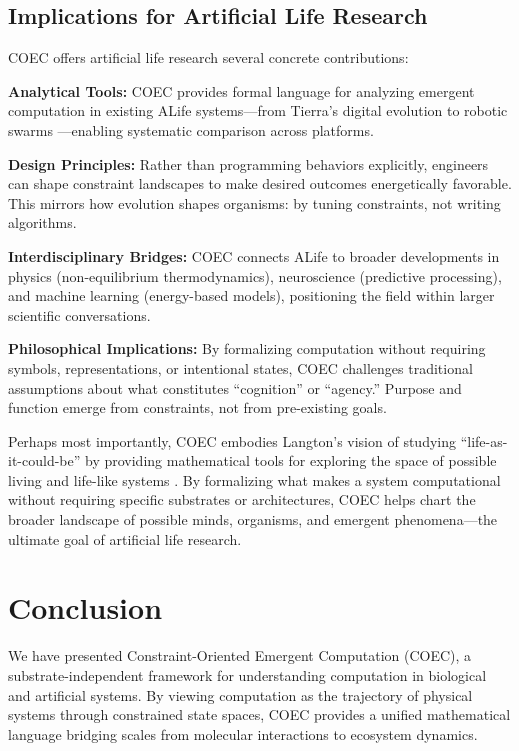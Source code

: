 \documentclass[11pt]{article}
\begin{document}
\subsection{Implications for Artificial Life Research}

COEC offers artificial life research several concrete contributions:

\textbf{Analytical Tools:} COEC provides formal language for analyzing emergent computation in existing ALife systems—from Tierra's digital evolution \citep{ray1991evolution} to robotic swarms \citep{bonabeau1999swarm}—enabling systematic comparison across platforms.

\textbf{Design Principles:} Rather than programming behaviors explicitly, engineers can shape constraint landscapes to make desired outcomes energetically favorable. This mirrors how evolution shapes organisms: by tuning constraints, not writing algorithms.

\textbf{Interdisciplinary Bridges:} COEC connects ALife to broader developments in physics (non-equilibrium thermodynamics), neuroscience (predictive processing), and machine learning (energy-based models), positioning the field within larger scientific conversations.

\textbf{Philosophical Implications:} By formalizing computation without requiring symbols, representations, or intentional states, COEC challenges traditional assumptions about what constitutes ``cognition'' or ``agency.'' Purpose and function emerge from constraints, not from pre-existing goals.

Perhaps most importantly, COEC embodies Langton's vision of studying ``life-as-it-could-be'' by providing mathematical tools for exploring the space of possible living and life-like systems \citep{langton1989artificial}. By formalizing what makes a system computational without requiring specific substrates or architectures, COEC helps chart the broader landscape of possible minds, organisms, and emergent phenomena—the ultimate goal of artificial life research.

\section{Conclusion}

We have presented Constraint-Oriented Emergent Computation (COEC), a substrate-independent framework for understanding computation in biological and artificial systems. By viewing computation as the trajectory of physical systems through constrained state spaces, COEC provides a unified mathematical language bridging scales from molecular interactions to ecosystem dynamics.
\end{document}
